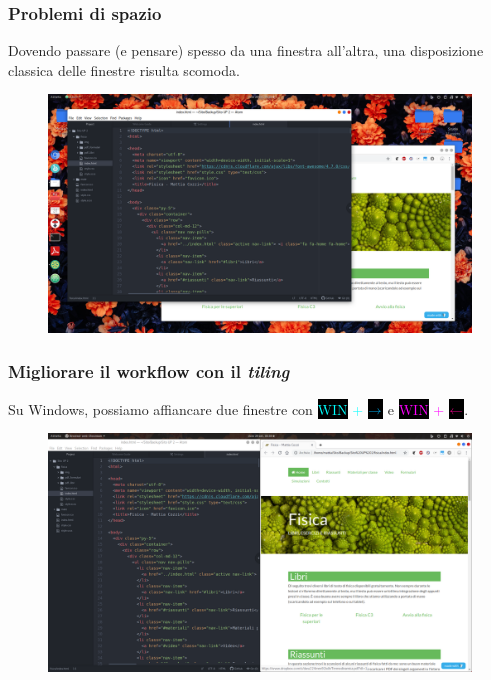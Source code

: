 \documentclass[]{beamer}
\begin{document}
\begin{frame}
\frametitle{Problemi di spazio}
Dovendo passare (e pensare) spesso da una finestra all'altra, una disposizione classica delle finestre risulta scomoda.
\begin{figure}
\includegraphics[width=.9\columnwidth]{screenshots/workflow1.png}
\end{figure}
\end{frame}


\begin{frame}
\frametitle{Migliorare il workflow con il \emph{tiling}}

Su Windows, possiamo affiancare due finestre con \colorbox{black}{\textcolor{cyan}{WIN}} \textcolor{cyan}{+} \colorbox{black}{$ \textcolor{cyan}{\rightarrow} $} e \colorbox{black}{\textcolor{magenta}{WIN}} \textcolor{magenta}{+} \colorbox{black}{$ \textcolor{magenta}{\leftarrow} $}.

\begin{figure}
\includegraphics[width=.9\columnwidth]{screenshots/workflow2.png}
\end{figure}


\end{frame}
\end{document}
